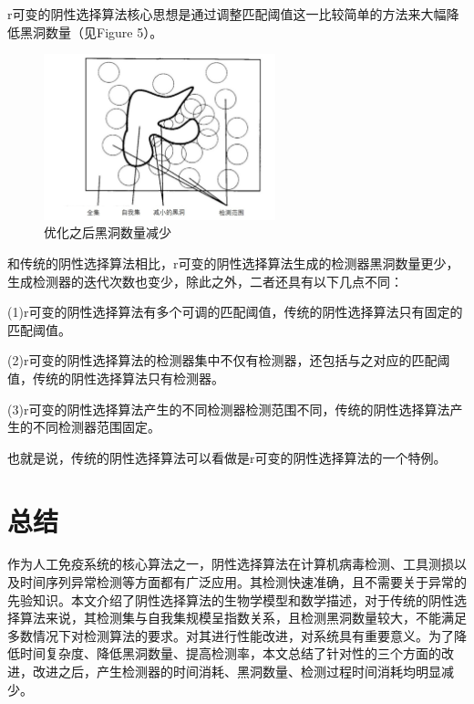 \documentclass[preprint,12pt,3p]{elsarticle}
\begin{document}
\par
r可变的阴性选择算法核心思想是通过调整匹配阈值这一比较简单的方法来大幅降低黑洞数量（见Figure 5）。

\begin{figure}[hb]
  \centering
  \includegraphics[width=0.6\textwidth]{img/reducedblackhole.jpg}
  \caption{优化之后黑洞数量减少}
\end{figure}

\par
和传统的阴性选择算法相比，r可变的阴性选择算法生成的检测器黑洞数量更少，生成检测器的迭代次数也变少，除此之外，二者还具有以下几点不同：
\par
(1)r可变的阴性选择算法有多个可调的匹配阈值，传统的阴性选择算法只有固定的匹配阈值。
\par
(2)r可变的阴性选择算法的检测器集中不仅有检测器，还包括与之对应的匹配阈值，传统的阴性选择算法只有检测器。
\par
(3)r可变的阴性选择算法产生的不同检测器检测范围不同，传统的阴性选择算法产生的不同检测器范围固定。
\par
也就是说，传统的阴性选择算法可以看做是r可变的阴性选择算法的一个特例。


\section{总结}
\label{sec4}
作为人工免疫系统的核心算法之一，阴性选择算法在计算机病毒检测、工具测损以及时间序列异常检测等方面都有广泛应用。其检测快速准确，且不需要关于异常的先验知识。本文介绍了阴性选择算法的生物学模型和数学描述，对于传统的阴性选择算法来说，其检测集与自我集规模呈指数关系，且检测黑洞数量较大，不能满足多数情况下对检测算法的要求。对其进行性能改进，对系统具有重要意义。为了降低时间复杂度、降低黑洞数量、提高检测率，本文总结了针对性的三个方面的改进，改进之后，产生检测器的时间消耗、黑洞数量、检测过程时间消耗均明显减少。
\end{document}
